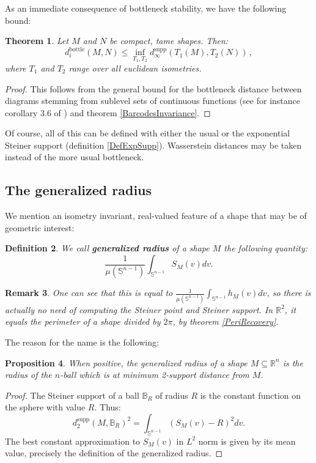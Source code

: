 \documentclass[a4paper]{article}
\newtheorem{theorem}{Theorem}[section]
\newtheorem{prop}[theorem]{Proposition}
\newtheorem{definition}[theorem]{Definition}
\newtheorem{remark}[theorem]{Remark}
\newcommand{\bb}{\mathbb}
\newcommand{\dsupp}{d^{\operatorname{supp}}}
\newcommand{\dbottle}{{d_i^{\operatorname{bottle}}}}
\begin{document}
As an immediate consequence of bottleneck stability, we have the following bound:
\begin{theorem}
	Let $M$ and $N$ be compact, tame shapes. Then:
	\[ \dbottle(M,N) \leq \inf_{T_1, T_2} \dsupp_\infty(T_1(M),T_2(N))\, ,  \]
	where $T_1$ and $T_2$ range over all euclidean isometries.
\end{theorem}
\begin{proof}
	This follows from the general bound for the bottleneck distance between diagrams stemming from sublevel sets of continuous functions (see for instance corollary 3.6 of \cite{oudot2015persistence}) and theorem \ref{BarcodesInvariance}.
\end{proof}

Of course, all of this can be defined with either the usual or the exponential Steiner support (definition \ref{DefExpSupp}). Wasserstein distances may be taken instead of the more usual bottleneck.

\subsection{The generalized radius}
We mention an isometry invariant, real-valued feature of a shape that may be of geometric interest:
\begin{definition}
	\label{DefGenRadius}
	We call \textbf{generalized radius} of a shape $M$ the following quantity:
	\[ \frac{1}{\mu(\bb S^{n-1})} \int_{\bb S^{n-1}} S_M(v) dv.\]
\end{definition}

\begin{remark}
	One can see that this is equal to $\frac{1}{\mu(\bb S^{n-1})} \int_{\bb S^{n-1}} h_M(v) dv$, so there is actually no need of computing the Steiner point and Steiner support. In $\bb R^2$, it equals the perimeter of a shape divided by $2\pi$, by theorem \ref{PeriRecovery}.
\end{remark}

The reason for the name is the following:
\begin{prop}
	When positive, the generalized radius of a shape $M\subseteq \bb R^n$ is the radius of the $n$-ball which is at minimum 2-support distance from $M$.
\end{prop}

\begin{proof}
	The Steiner support of a ball $\bb B_R$ of radius $R$ is the constant function on the sphere with value $R$. Thus:
	\[ \dsupp_2(M, \bb B_R)^2=\int_{\bb S^{n-1}}\left( S_M(v)-R \right)^2 dv.\]
	The best constant approximation to $S_M(v)$ in $L^2$ norm is given by its mean value, precisely the definition of the generalized radius.
\end{proof}
\end{document}
